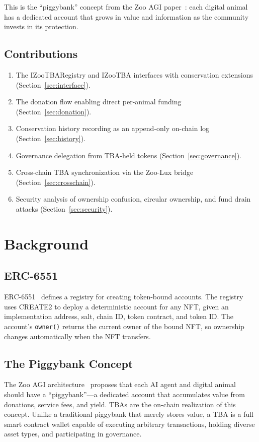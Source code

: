 \documentclass[11pt,letterpaper]{article}
\begin{document}
This is the ``piggybank'' concept from the Zoo AGI paper~\cite{zooagi2024}: each digital animal has a dedicated account that grows in value and information as the community invests in its protection.

\subsection{Contributions}

\begin{enumerate}
    \item The IZooTBARegistry and IZooTBA interfaces with conservation extensions (Section~\ref{sec:interface}).
    \item The donation flow enabling direct per-animal funding (Section~\ref{sec:donation}).
    \item Conservation history recording as an append-only on-chain log (Section~\ref{sec:history}).
    \item Governance delegation from TBA-held tokens (Section~\ref{sec:governance}).
    \item Cross-chain TBA synchronization via the Zoo-Lux bridge (Section~\ref{sec:crosschain}).
    \item Security analysis of ownership confusion, circular ownership, and fund drain attacks (Section~\ref{sec:security}).
\end{enumerate}

\section{Background}

\subsection{ERC-6551}

ERC-6551~\cite{erc6551} defines a registry for creating token-bound accounts. The registry uses CREATE2 to deploy a deterministic account for any NFT, given an implementation address, salt, chain ID, token contract, and token ID. The account's \texttt{owner()} returns the current owner of the bound NFT, so ownership changes automatically when the NFT transfers.

\subsection{The Piggybank Concept}

The Zoo AGI architecture~\cite{zooagi2024} proposes that each AI agent and digital animal should have a ``piggybank''---a dedicated account that accumulates value from donations, service fees, and yield. TBAs are the on-chain realization of this concept. Unlike a traditional piggybank that merely stores value, a TBA is a full smart contract wallet capable of executing arbitrary transactions, holding diverse asset types, and participating in governance.
\end{document}
